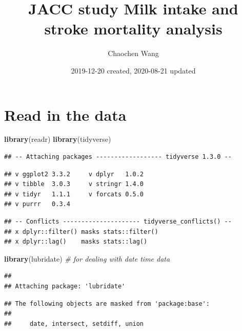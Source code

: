 \documentclass[
]{article}
\title{JACC study Milk intake and stroke mortality analysis}
\author{Chaochen Wang}
\date{2019-12-20 created, 2020-08-21 updated}
\newenvironment{Shaded}{\begin{snugshade}}{\end{snugshade}}
\newcommand{\CommentTok}[1]{\textcolor[rgb]{0.56,0.35,0.01}{\textit{#1}}}
\newcommand{\KeywordTok}[1]{\textcolor[rgb]{0.13,0.29,0.53}{\textbf{#1}}}
\newcommand{\NormalTok}[1]{#1}
\begin{document}
\maketitle

{
\setcounter{tocdepth}{3}
\tableofcontents
}
\hypertarget{read-in-the-data}{%
\section{Read in the data}\label{read-in-the-data}}

\begin{Shaded}
\begin{Highlighting}[]
\KeywordTok{library}\NormalTok{(readr)}
\KeywordTok{library}\NormalTok{(tidyverse)}
\end{Highlighting}
\end{Shaded}

\begin{verbatim}
## -- Attaching packages ------------------ tidyverse 1.3.0 --
\end{verbatim}

\begin{verbatim}
## v ggplot2 3.3.2     v dplyr   1.0.2
## v tibble  3.0.3     v stringr 1.4.0
## v tidyr   1.1.1     v forcats 0.5.0
## v purrr   0.3.4
\end{verbatim}

\begin{verbatim}
## -- Conflicts --------------------- tidyverse_conflicts() --
## x dplyr::filter() masks stats::filter()
## x dplyr::lag()    masks stats::lag()
\end{verbatim}

\begin{Shaded}
\begin{Highlighting}[]
\KeywordTok{library}\NormalTok{(lubridate) }\CommentTok{\# for dealing with date time data }
\end{Highlighting}
\end{Shaded}

\begin{verbatim}
## 
## Attaching package: 'lubridate'
\end{verbatim}

\begin{verbatim}
## The following objects are masked from 'package:base':
## 
##     date, intersect, setdiff, union
\end{verbatim}
\end{document}

